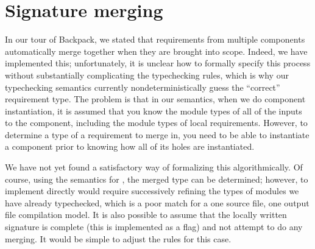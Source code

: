 \section{Signature merging}
\label{sec:merging}

In our tour of Backpack, we stated that requirements from multiple
components automatically merge together when they are brought into
scope.  Indeed, we have implemented this; unfortunately, it is unclear
how to formally specify this process without substantially complicating
the typechecking rules, which is why our typechecking semantics
currently nondeterministically guess the ``correct'' requirement type.
The problem is that in our semantics, when we do component
instantiation, it is assumed that you know the module types of all of
the inputs to the component, including the module types of local
requirements.  However, to determine a type of a requirement to merge
in, you need to be able to instantiate a component prior to knowing how
all of its holes are instantiated.

We have not yet found a satisfactory way of formalizing this
algorithmically.  Of course, using the semantics for \OldBackpack{}, the
merged type can be determined; however, to implement \OldBackpack{}
directly would require successively refining the types of modules we
have already typechecked, which is a poor match for a one source file,
one output file compilation model.  It is also possible to assume
that the locally written signature is complete (this is implemented
as a flag) and not attempt to do any merging.  It would be simple to
adjust the rules for this case.
